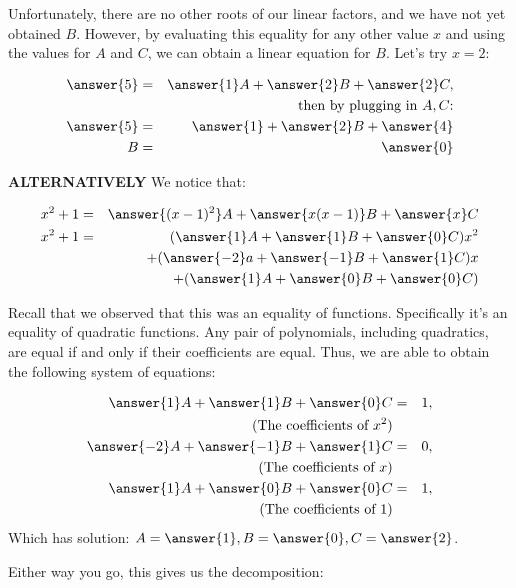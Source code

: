 \documentclass{ximera}
\begin{document}
\begin{explanation}
Unfortunately, there are no other roots of our linear factors, and we have not yet obtained $B$.  However, by evaluating this equality for any other value $x$ and using the values for $A$ and $C$, we can obtain a linear equation for $B$.  Let's try $x=2$:

\begin{eqnarray*}
\answer{5}&=&\answer{1}A+\answer{2}B+\answer{2}C,\\
&& \text{then by plugging in $A, C$:}\\
\answer{5}&=&\answer{1}+\answer{2}B+\answer{4}\\
B&=&\answer{0}
\end{eqnarray*}

\textbf{ALTERNATIVELY} We notice that:

\begin{eqnarray*}
x^2+1&=&\answer{(x-1)^2}A+\answer{x(x-1)}B+\answer{x}C\\
x^2+1&=&(\answer{1}A+\answer{1}B+\answer{0}C)x^2\\
&&+(\answer{-2}a+\answer{-1}B+\answer{1}C)x\\
&&+(\answer{1}A+\answer{0}B+\answer{0}C)
\end{eqnarray*}

Recall that we observed that this was an equality of functions.  Specifically it's an equality of quadratic functions.  Any pair of polynomials, including quadratics, are equal if and only if their coefficients are equal.  Thus, we are able to obtain the following system of equations:

\begin{eqnarray*}
\answer{1}A+\answer{1}B+\answer{0}C&=&1,\\ \text{(The coefficients of $x^2$)}&&\\
\answer{-2}A+\answer{-1}B+\answer{1}C&=&0,\\ \text{(The coefficients of $x$)}&&\\
\answer{1}A+\answer{0}B+\answer{0}C&=&1,\\  \text{(The coefficients of $1$)}&&\\
\end{eqnarray*}
Which has solution: $A=\answer{1}, B=\answer{0}, C=\answer{2}$.

Either way you go, this gives us the decomposition:


\end{explanation}
\end{document}
